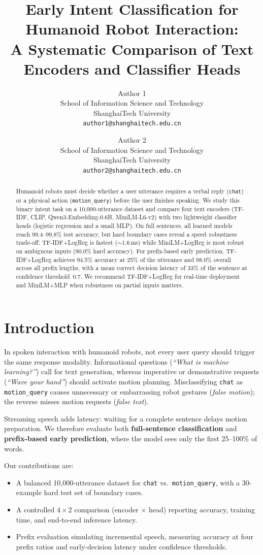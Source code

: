 \documentclass{article}
\title{Early Intent Classification for Humanoid Robot Interaction:\\
A Systematic Comparison of Text Encoders and Classifier Heads}
\author{%
  Author 1 \\
  School of Information Science and Technology \\
  ShanghaiTech University \\
  \texttt{author1@shanghaitech.edu.cn}
  \and
  Author 2 \\
  School of Information Science and Technology \\
  ShanghaiTech University \\
  \texttt{author2@shanghaitech.edu.cn}
}
\begin{document}
\maketitle

\begin{abstract}
Humanoid robots must decide whether a user utterance requires a verbal reply
(\texttt{chat}) or a physical action (\texttt{motion\_query}) before the
user finishes speaking.
We study this binary intent task on a 10{,}000-utterance dataset and compare
four text encoders (TF-IDF, CLIP, Qwen3-Embedding-0.6B, MiniLM-L6-v2)
with two lightweight classifier heads (logistic regression and a small MLP).
On full sentences, all learned models reach 99.4--99.8\% test accuracy, but
hard boundary cases reveal a speed--robustness trade-off: TF-IDF+LogReg is
fastest ($\sim$1.6\,ms) while MiniLM+LogReg is most robust on ambiguous
inputs (90.0\% hard accuracy).
For prefix-based early prediction, TF-IDF+LogReg achieves 94.5\% accuracy at
25\% of the utterance and 98.0\% overall across all prefix lengths, with a
mean correct decision latency of 33\% of the sentence at confidence
threshold~0.7.
We recommend TF-IDF+LogReg for real-time deployment and MiniLM+MLP when
robustness on partial inputs matters.
\end{abstract}

\section{Introduction}

In spoken interaction with humanoid robots, not every user query should trigger
the same response modality.
Informational questions (\emph{``What is machine learning?''}) call for
text generation, whereas imperative or demonstrative requests
(\emph{``Wave your hand''}) should activate motion planning.
Misclassifying \texttt{chat} as \texttt{motion\_query} causes unnecessary or
embarrassing robot gestures (\emph{false motion}); the reverse misses motion
requests (\emph{false text}).

Streaming speech adds latency: waiting for a complete sentence delays motion
preparation.
We therefore evaluate both \textbf{full-sentence classification} and
\textbf{prefix-based early prediction}, where the model sees only the first
25--100\% of words.

Our contributions are:
\begin{itemize}
  \item A balanced 10{,}000-utterance dataset for \texttt{chat} vs.\
        \texttt{motion\_query}, with a 30-example hard test set of boundary
        cases.
  \item A controlled $4 \times 2$ comparison (encoder $\times$ head) reporting
        accuracy, training time, and end-to-end inference latency.
  \item Prefix evaluation simulating incremental speech, measuring accuracy at
        four prefix ratios and early-decision latency under confidence
        thresholds.
\end{itemize}
\end{document}
